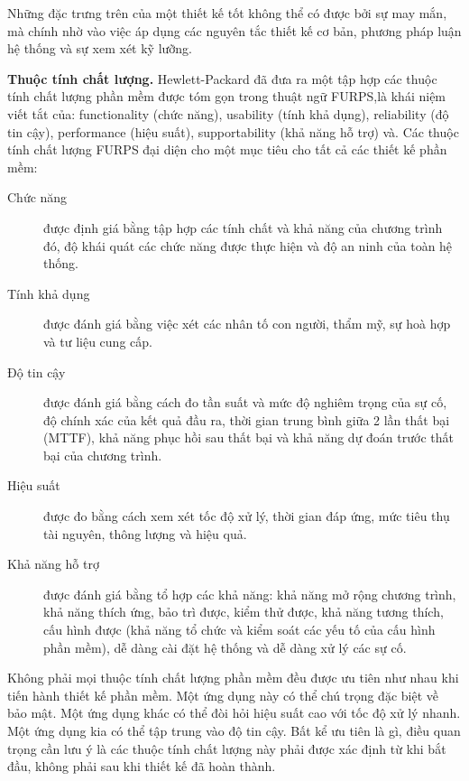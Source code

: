 \documentclass[./../SoftwareEngineering.tex]{subfiles}
\begin{document}
	Những đặc trưng trên của một thiết kế tốt không thể có được bởi sự may mắn, mà chính nhờ vào việc áp dụng các nguyên tắc thiết kế cơ bản, phương pháp luận hệ thống và sự xem xét kỹ lưỡng.
	
	
	\textbf{Thuộc tính chất lượng.} Hewlett-Packard \cites{Gra87} đã đưa ra một tập hợp các thuộc tính chất lượng phần mềm được tóm gọn trong thuật ngữ FURPS,là khái niệm viết tắt của: functionality (chức năng), usability (tính khả dụng), reliability (độ tin cậy), performance (hiệu suất), supportability (khả năng hỗ trợ) và. Các thuộc tính chất lượng FURPS đại diện cho một mục tiêu cho tất cả các thiết kế phần mềm:
	\begin{description}
		\item[Chức năng] được định giá bằng tập hợp các tính chất và khả năng của chương trình đó, độ khái quát các chức năng được thực hiện và độ an ninh của toàn hệ thống.
		\item [Tính khả dụng]  được đánh giá bằng việc xét các nhân tố con người, thẩm mỹ, sự hoà hợp và tư liệu cung cấp. 
		\item[Độ tin cậy] được đánh giá bằng cách đo tần suất và mức độ nghiêm trọng của sự cố, độ chính xác của kết quả đầu ra, thời gian trung bình giữa 2 lần thất bại (MTTF), khả năng phục hồi sau thất bại và khả năng dự đoán trước thất bại của chương trình. 
		\item[Hiệu suất] được đo bằng cách xem xét tốc độ xử lý, thời gian đáp ứng, mức tiêu thụ tài nguyên, thông lượng và hiệu quả. 
		\item[Khả năng hỗ trợ] được đánh giá bằng tổ hợp các khả năng: khả năng mở rộng chương trình, khả năng thích ứng, bảo trì được, kiểm thử được, khả năng tương thích, cấu hình được (khả năng tổ chức và kiểm soát các yếu tố của cấu hình phần mềm), dễ dàng cài đặt hệ thống và dễ dàng xử lý các sự cố.
	\end{description}
	Không phải mọi thuộc tính chất lượng phần mềm đều được ưu tiên như nhau khi tiến hành thiết kế phần mềm. Một ứng dụng này có thể chú trọng đặc biệt về bảo mật. Một ứng dụng khác có thể đòi hỏi hiệu suất cao với  tốc độ xử lý nhanh. Một ứng dụng kia có thể tập trung vào độ tin cậy. Bất kể ưu tiên là gì, điều quan trọng cần lưu ý là các thuộc tính chất lượng này phải được xác định từ khi bắt đầu, không phải sau khi thiết kế đã  hoàn thành.
\end{document}
